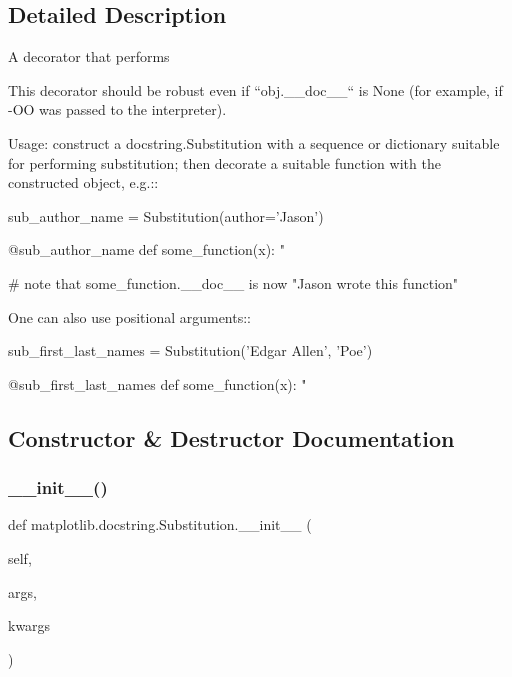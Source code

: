 \subsection{Detailed Description}
\begin{DoxyVerb}A decorator that performs %

This decorator should be robust even if ``obj.__doc__`` is None (for
example, if -OO was passed to the interpreter).

Usage: construct a docstring.Substitution with a sequence or dictionary
suitable for performing substitution; then decorate a suitable function
with the constructed object, e.g.::

    sub_author_name = Substitution(author='Jason')

    @sub_author_name
    def some_function(x):
        "%

    # note that some_function.__doc__ is now "Jason wrote this function"

One can also use positional arguments::

    sub_first_last_names = Substitution('Edgar Allen', 'Poe')

    @sub_first_last_names
    def some_function(x):
        "%
\end{DoxyVerb}
 

\subsection{Constructor \& Destructor Documentation}
\mbox{\label{classmatplotlib_1_1docstring_1_1Substitution_ab8010fcdd00dcc7c88a90748d4c37d4f}} 
\subsubsection{\texorpdfstring{\+\_\+\+\_\+init\+\_\+\+\_\+()}{\_\_init\_\_()}}
{\footnotesize\ttfamily def matplotlib.\+docstring.\+Substitution.\+\_\+\+\_\+init\+\_\+\+\_\+ (\begin{DoxyParamCaption}\item[{}]{self,  }\item[{}]{args,  }\item[{}]{kwargs }\end{DoxyParamCaption})}



